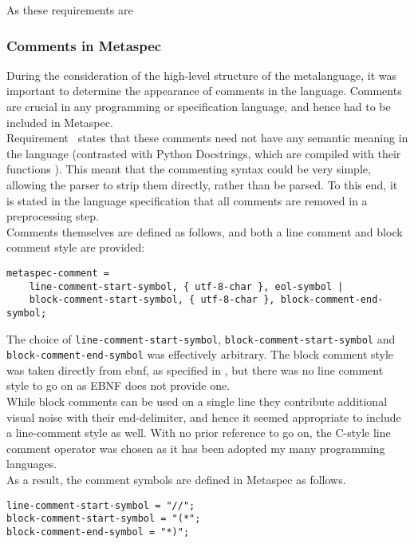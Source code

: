 As these requirements are 

\subsubsection{Comments in Metaspec} %
\label{ssub:comments_in_metaspec}
During the consideration of the high-level structure of the metalanguage, it was important to determine the appearance of comments in the language.
Comments are crucial in any programming or specification language, and hence had to be included in Metaspec. \\

Requirement~ states that these comments need not have any semantic meaning in the language (contrasted with Python Docstrings, which are compiled with their functions \citep{python_docstrings}).
This meant that the commenting syntax could be very simple, allowing the parser to strip them directly, rather than be parsed.
To this end, it is stated in the language specification that all comments are removed in a preprocessing step. \\

Comments themselves are defined as follows, and both a line comment and block comment style are provided:
\begin{lstlisting}[caption={Comments in Metaspec}, label={lst:comments_in_metaspec}, firstnumber=149]
metaspec-comment =
    line-comment-start-symbol, { utf-8-char }, eol-symbol |
    block-comment-start-symbol, { utf-8-char }, block-comment-end-symbol;
\end{lstlisting}

The choice of \lstinline{line-comment-start-symbol}, \lstinline{block-comment-start-symbol} and \lstinline{block-comment-end-symbol} was effectively arbitrary.
The block comment style was taken directly from \gls{ebnf}, as specified in \cite{standard1996ebnf}, but there was no line comment style to go on as EBNF does not provide one. \\

While block comments can be used on a single line they contribute additional visual noise with their end-delimiter, and hence it seemed appropriate to include a line-comment style as well.
With no prior reference to go on, the C-style line comment operator was chosen as it has been adopted my many programming languages. \\

As a result, the comment symbols are defined in Metaspec as follows.
\begin{lstlisting}[caption={Metaspec Comment Symbols}, label={lst:metaspec_comment_symbols}, numbers=none]
line-comment-start-symbol = "//";
block-comment-start-symbol = "(*";
block-comment-end-symbol = "*)";
\end{lstlisting}

